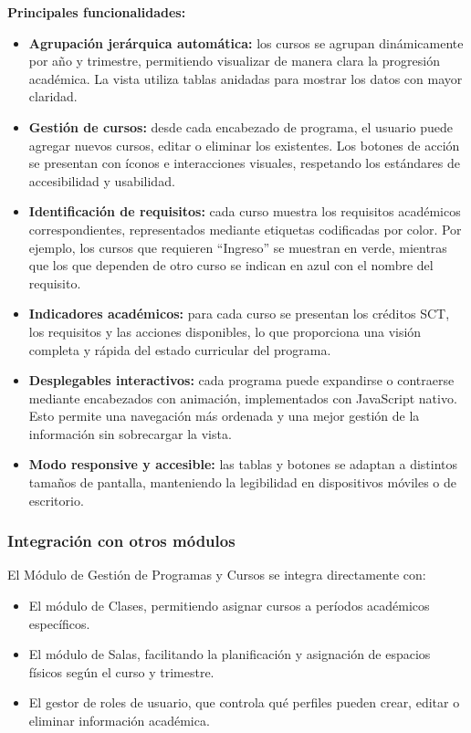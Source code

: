 \textbf{Principales funcionalidades:}

\begin{itemize}
    \item \textbf{Agrupación jerárquica automática:} los cursos se agrupan dinámicamente por año y trimestre, permitiendo visualizar de manera clara la progresión académica. La vista utiliza tablas anidadas para mostrar los datos con mayor claridad.
    
    \item \textbf{Gestión de cursos:} desde cada encabezado de programa, el usuario puede agregar nuevos cursos, editar o eliminar los existentes. Los botones de acción se presentan con íconos e interacciones visuales, respetando los estándares de accesibilidad y usabilidad.
    
    \item \textbf{Identificación de requisitos:} cada curso muestra los requisitos académicos correspondientes, representados mediante etiquetas codificadas por color. Por ejemplo, los cursos que requieren ``Ingreso'' se muestran en verde, mientras que los que dependen de otro curso se indican en azul con el nombre del requisito.
    
    \item \textbf{Indicadores académicos:} para cada curso se presentan los créditos SCT, los requisitos y las acciones disponibles, lo que proporciona una visión completa y rápida del estado curricular del programa.
    
    \item \textbf{Desplegables interactivos:} cada programa puede expandirse o contraerse mediante encabezados con animación, implementados con JavaScript nativo. Esto permite una navegación más ordenada y una mejor gestión de la información sin sobrecargar la vista.
    
    \item \textbf{Modo responsive y accesible:} las tablas y botones se adaptan a distintos tamaños de pantalla, manteniendo la legibilidad en dispositivos móviles o de escritorio.
\end{itemize}

\subsubsection{Integración con otros módulos}

El Módulo de Gestión de Programas y Cursos se integra directamente con:

\begin{itemize}
    \item El módulo de Clases, permitiendo asignar cursos a períodos académicos específicos.
    \item El módulo de Salas, facilitando la planificación y asignación de espacios físicos según el curso y trimestre.
    \item El gestor de roles de usuario, que controla qué perfiles pueden crear, editar o eliminar información académica.
\end{itemize}

